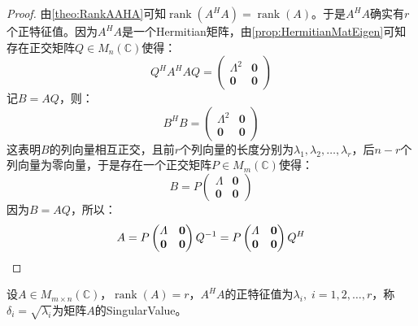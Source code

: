\begin{proof}
	由\cref{theo:RankAAHA}可知$\operatorname{rank}(A^HA)=\operatorname{rank}(A)$。于是$A^HA$确实有$r$个正特征值。因为$A^HA$是一个Hermitian矩阵，由\cref{prop:HermitianMatEigen}可知存在正交矩阵$Q\in M_{n}(\mathbb{C})$使得：
	\begin{equation*}
		Q^HA^HAQ=
		\begin{pmatrix}
			\varLambda^2 & \mathbf{0} \\
			\mathbf{0} & \mathbf{0}
		\end{pmatrix}
	\end{equation*}
	记$B=AQ$，则：
	\begin{equation*}
		B^HB=
		\begin{pmatrix}
			\varLambda^2 & \mathbf{0} \\
			\mathbf{0} & \mathbf{0}
		\end{pmatrix}
	\end{equation*}
	这表明$B$的列向量相互正交，且前$r$个列向量的长度分别为$\lambda_1,\lambda_2,\dots,\lambda_r$，后$n-r$个列向量为零向量，于是存在一个正交矩阵$P\in M_{m}(\mathbb{C})$使得：
	\begin{equation*}
		B=P
		\begin{pmatrix}
			\varLambda & \mathbf{0} \\
			\mathbf{0} & \mathbf{0}
		\end{pmatrix}
	\end{equation*}
	因为$B=AQ$，所以：
	\begin{equation*}
		A=P
		\begin{pmatrix}
			\varLambda & \mathbf{0} \\
			\mathbf{0} & \mathbf{0}
		\end{pmatrix}Q^{-1}
		=P
		\begin{pmatrix}
			\varLambda & \mathbf{0} \\
			\mathbf{0} & \mathbf{0}
		\end{pmatrix}Q^H\qedhere
	\end{equation*}
\end{proof}
\begin{definition}
	设$A\in M_{m\times n}(\mathbb{C})$，$\operatorname{rank}(A)=r$，$A^HA$的正特征值为$\lambda_i,\;i=1,2,\dots,r$，称$\delta_i=\sqrt{\lambda_i}$为矩阵$A$的\gls{SingularValue}。
\end{definition}